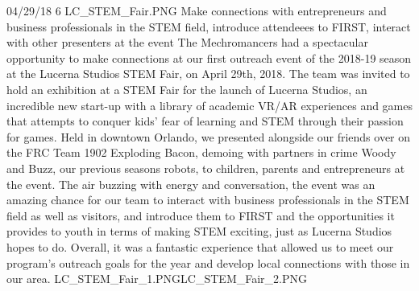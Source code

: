 {04/29/18}
{6} 
{LC_STEM_Fair.PNG} 
{Make connections with entrepreneurs and business professionals in the STEM field, introduce attendeees to FIRST, interact with other presenters at the event} 
{
The Mechromancers had a spectacular opportunity to make connections at our first outreach event of the 2018-19 season at the Lucerna Studios STEM Fair, on April 29th, 2018. The team was invited to hold an exhibition at a STEM Fair for the launch of Lucerna Studios, an incredible new start-up with a library of academic VR/AR experiences and games that attempts to conquer kids' fear of learning and STEM through their passion for games. Held in downtown Orlando, we presented alongside our friends over on the FRC Team 1902 Exploding Bacon, demoing with partners in crime Woody and Buzz, our previous seasons robots, to children, parents and entrepreneurs at the event. The air buzzing with energy and conversation, the event was an amazing chance for our team to interact with business professionals in the STEM field as well as visitors, and introduce them to FIRST and the opportunities it provides to youth in terms of making STEM exciting, just as Lucerna Studios hopes to do. Overall, it was a fantastic experience that allowed us to meet our program's outreach goals for the year and develop local connections with those in our area. 
}
{LC_STEM_Fair_1.PNG}{LC_STEM_Fair_2.PNG}